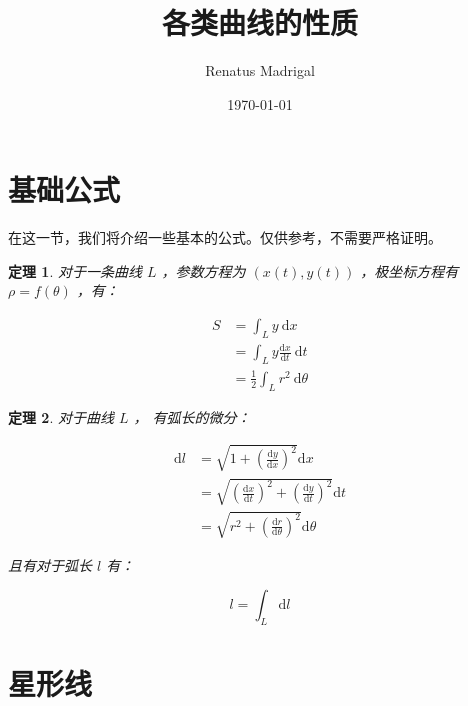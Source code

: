 \documentclass[11pt]{article}
\title{各类曲线的性质}
\author{Renatus Madrigal}
\date{\today}
\newtheorem{theorem}{定理}
\numberwithin{equation}{section}
\numberwithin{theorem}{section}
\begin{document}
\maketitle
\tableofcontents

\section{基础公式}\label{sec:basic-formula}

在这一节，我们将介绍一些基本的公式。仅供参考，不需要严格证明。

\begin{theorem}\label{thm:area-formula}
  对于一条曲线 $L$ ，参数方程为 $(x(t), y(t))$ ，极坐标方程有 $\rho = f(\theta)$ ，有：

  \begin{equation}
    \begin{aligned}
      S &= \int_L y \ \mathrm{d} x \\
      &= \int_L y \frac{\mathrm{d}x}{\mathrm{d}t}\ \mathrm{d}t \\
      &= \frac{1}{2}\int_L r^2\ \mathrm{d}\theta
    \end{aligned}
  \end{equation}

\end{theorem}

\begin{theorem}\label{thm:length-formula}
  对于曲线 $L$ ， 有弧长的微分：

  \begin{equation}
    \begin{aligned}
      \mathrm{d} l &= \sqrt{1 + \left( \frac{\mathrm{d}y}{\mathrm{d}x}\right)^2} \mathrm{d}x \\
      &= \sqrt{\left(\frac{\mathrm{d}x}{\mathrm{d}t}\right)^2
      + \left(\frac{\mathrm{d}y}{\mathrm{d}t}\right)^2} \mathrm{d}t \\
      &= \sqrt{r^2 + \left(\frac{\mathrm{d}r}{\mathrm{d}\theta}\right)^2} \mathrm{d}\theta
    \end{aligned}
  \end{equation}

  且有对于弧长 $l$ 有：

  \begin{equation}
    l = \int_L \mathrm{d}l
  \end{equation}
\end{theorem}

\section{星形线}\label{sec:star-curve}
\end{document}
